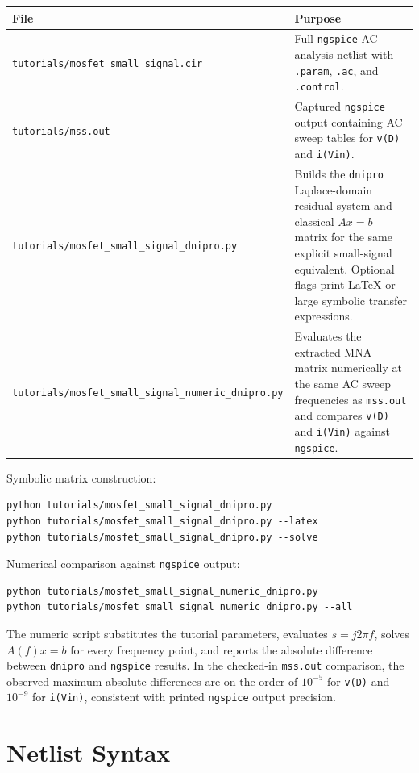 \documentclass[11pt,a4paper]{article}
\newcommand{\project}{\texttt{dnipro}}
\newcommand{\code}[1]{\texttt{#1}}
\newcommand{\ngspice}{\texttt{ngspice}}
\begin{document}
\begin{longtable}{p{}p{}}
\toprule
File & Purpose \\
\midrule
\code{tutorials/mosfet\_small\_signal.cir} &
    Full \ngspice{} AC analysis netlist with \code{.param}, \code{.ac}, and
    \code{.control}. \\
\code{tutorials/mss.out} &
    Captured \ngspice{} output containing AC sweep tables for \code{v(D)} and
    \code{i(Vin)}. \\
\code{tutorials/mosfet\_small\_signal\_dnipro.py} &
    Builds the \project{} Laplace-domain residual system and classical
    \(A x = b\) matrix for the same explicit small-signal equivalent. Optional
    flags print \LaTeX{} or large symbolic transfer expressions. \\
\code{tutorials/mosfet\_small\_signal\_numeric\_dnipro.py} &
    Evaluates the extracted MNA matrix numerically at the same AC sweep
    frequencies as \code{mss.out} and compares \code{v(D)} and \code{i(Vin)}
    against \ngspice{}. \\
\bottomrule
\end{longtable}

Symbolic matrix construction:

\begin{lstlisting}[style=shell]
python tutorials/mosfet_small_signal_dnipro.py
python tutorials/mosfet_small_signal_dnipro.py --latex
python tutorials/mosfet_small_signal_dnipro.py --solve
\end{lstlisting}

Numerical comparison against \ngspice{} output:

\begin{lstlisting}[style=shell]
python tutorials/mosfet_small_signal_numeric_dnipro.py
python tutorials/mosfet_small_signal_numeric_dnipro.py --all
\end{lstlisting}

The numeric script substitutes the tutorial parameters, evaluates
\(s = j2\pi f\), solves \(A(f)x=b\) for every frequency point, and reports the
absolute difference between \project{} and \ngspice{} results. In the checked-in
\code{mss.out} comparison, the observed maximum absolute differences are on the
order of \(10^{-5}\) for \code{v(D)} and \(10^{-9}\) for \code{i(Vin)}, consistent
with printed \ngspice{} output precision.

\section{Netlist Syntax}
\label{sec:syntax}
\end{document}
